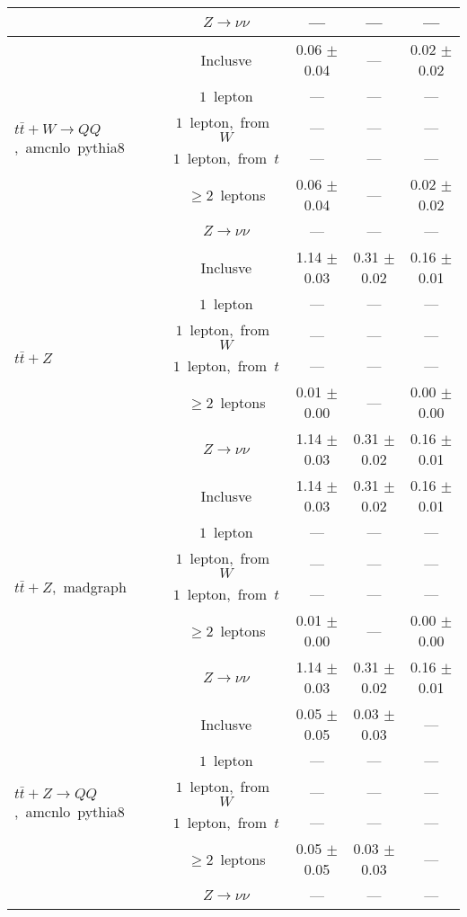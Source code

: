 \documentclass{article}
\begin{document}
\begin{longtable}{|l|c|c|c|c|}
 & $Z\rightarrow\nu\nu$  & ---  & ---  & --- \\* 
\hline 
\multirow{6}{*}{$t\bar{t}+W{\rightarrow}QQ$,~amcnlo~pythia8} & Inclusve  & 0.06 $\pm$ 0.04  & ---  & 0.02 $\pm$ 0.02 \\* 
 & $1$~lepton  & ---  & ---  & --- \\* 
 & $1$~lepton,~from~$W$  & ---  & ---  & --- \\* 
 & $1$~lepton,~from~$t$  & ---  & ---  & --- \\* 
 & $\ge2$~leptons  & 0.06 $\pm$ 0.04  & ---  & 0.02 $\pm$ 0.02 \\* 
 & $Z\rightarrow\nu\nu$  & ---  & ---  & --- \\* 
\hline 
\multirow{6}{*}{$t\bar{t}+Z$} & Inclusve  & 1.14 $\pm$ 0.03  & 0.31 $\pm$ 0.02  & 0.16 $\pm$ 0.01 \\* 
 & $1$~lepton  & ---  & ---  & --- \\* 
 & $1$~lepton,~from~$W$  & ---  & ---  & --- \\* 
 & $1$~lepton,~from~$t$  & ---  & ---  & --- \\* 
 & $\ge2$~leptons  & 0.01 $\pm$ 0.00  & ---  & 0.00 $\pm$ 0.00 \\* 
 & $Z\rightarrow\nu\nu$  & 1.14 $\pm$ 0.03  & 0.31 $\pm$ 0.02  & 0.16 $\pm$ 0.01 \\* 
\hline 
\multirow{6}{*}{$t\bar{t}+Z$,~madgraph} & Inclusve  & 1.14 $\pm$ 0.03  & 0.31 $\pm$ 0.02  & 0.16 $\pm$ 0.01 \\* 
 & $1$~lepton  & ---  & ---  & --- \\* 
 & $1$~lepton,~from~$W$  & ---  & ---  & --- \\* 
 & $1$~lepton,~from~$t$  & ---  & ---  & --- \\* 
 & $\ge2$~leptons  & 0.01 $\pm$ 0.00  & ---  & 0.00 $\pm$ 0.00 \\* 
 & $Z\rightarrow\nu\nu$  & 1.14 $\pm$ 0.03  & 0.31 $\pm$ 0.02  & 0.16 $\pm$ 0.01 \\* 
\hline 
\multirow{6}{*}{$t\bar{t}+Z{\rightarrow}QQ$,~amcnlo~pythia8} & Inclusve  & 0.05 $\pm$ 0.05  & 0.03 $\pm$ 0.03  & --- \\* 
 & $1$~lepton  & ---  & ---  & --- \\* 
 & $1$~lepton,~from~$W$  & ---  & ---  & --- \\* 
 & $1$~lepton,~from~$t$  & ---  & ---  & --- \\* 
 & $\ge2$~leptons  & 0.05 $\pm$ 0.05  & 0.03 $\pm$ 0.03  & --- \\* 
 & $Z\rightarrow\nu\nu$  & ---  & ---  & --- \\* 

\end{longtable}
\end{document}

